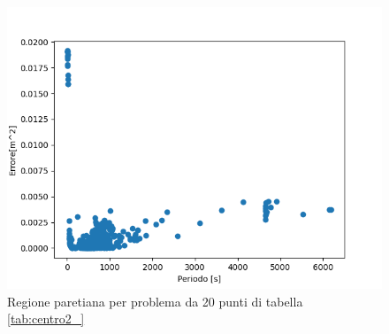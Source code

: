 \documentclass[a4paper,12pt]{report}
\begin{document}
\begin{itemize}
    \begin{figure}[H]
      \centering
      \includegraphics[scale=0.70]{img/puls0125/puntoUtopia20.png}
      \caption{Regione paretiana per problema da 20 punti di tabella \ref{tab:centro2_}}
      \label{fig:reg_ammis_20_0125}
    \end{figure}


\end{itemize}
\end{document}
